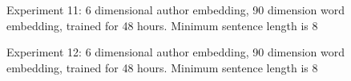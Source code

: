 \documentclass{article}%
\begin{document}
\begin{figure}
\noindent{}
\caption{Experiment 11: 6 dimensional author embedding, 90 dimension word embedding, trained for 48 hours. Minimum sentence length is 8}
\end{figure}
\begin{figure}
\noindent{}
\caption{Experiment 12: 6 dimensional author embedding, 90 dimension word embedding, trained for 48 hours. Minimum sentence length is 8}
\end{figure}
\end{document}
